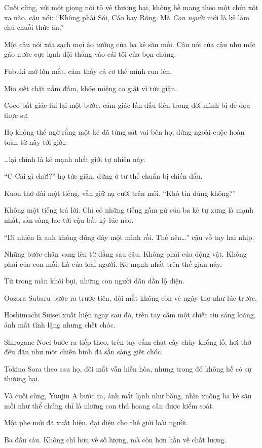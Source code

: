 \documentclass[../main.tex]{subfiles}
\begin{document}
Cuối cùng, với một giọng nói tỏ vẻ thương hại, không hề mang theo một chút xót xa nào, cậu nói: ``Không phải Sói, Cáo hay Rồng. Mà \emph{Con người} mới là kẻ làm chủ chuỗi thức ăn.''

Một câu nói xóa sạch mọi ảo tưởng của ba kẻ săn mồi. Câu nói của cậu như một gáo nước cực lạnh dội thẳng vào cái tôi của bọn chúng.

Fubuki mở lớn mắt, cảm thấy cả cơ thể mình run lên.

Mio siết chặt nắm đấm, khóe miệng co giật vì tức giận.

Coco bất giác lùi lại một bước, cảm giác lần đầu tiên trong đời mình bị đe dọa thực sự.

Họ không thể ngờ rằng một kẻ đã từng sát vai bên họ, đứng ngoài cuộc hoàn toàn từ nãy tới giờ\dots

\dots lại chính là kẻ mạnh nhất giới tự nhiên này.

``C-Cái gì chứ!?'' họ tức giận, đứng ở tư thế chuẩn bị chiến đấu.

Kuon thở dài một tiếng, vẫn giữ nụ cười trên môi. ``Khó tin đúng không?''

Không một tiếng trả lời. Chỉ có những tiếng gầm gừ của ba kẻ tự xưng là mạnh nhất, sẵn sàng lao tới cậu bất kỳ lúc nào.

``Dĩ nhiên là anh không đứng đây một mình rồi. Thế nên\dots'' cậu vỗ tay hai nhịp.

Những bước chân vang lên từ đằng sau cậu. Không phải của động vật. Không phải của con mồi. Là của loài người. Kẻ mạnh nhất trên thế gian này.

Từ trong màn khói bụi, những con người dần dần lộ diện.

Oozora Subaru bước ra trước tiên, đôi mắt không còn vẻ ngây thơ như lúc trước.

Hoshimachi Suisei xuất hiện ngay sau đó, trên tay cầm một chiếc rìu sáng loáng, ánh mắt tĩnh lặng nhưng chết chóc.

Shirogane Noel bước ra tiếp theo, trên tay cầm chặt cây chùy khổng lồ, hơi thở đều đặn như một chiến binh đã sẵn sàng giết chóc.

Tokino Sora theo sau họ, đôi mắt vẫn hiền hòa, nhưng trong đó không hề có sự thương hại.

Và cuối cùng, Yuujin A bước ra, ánh mắt lạnh như băng, nhìn xuống ba kẻ săn mồi như thể chúng chỉ là những con thú hoang cần được kiểm soát.

Một phe mới đã xuất hiện, đại diện cho thế giới loài người.

Ba đấu sáu. Không chỉ hơn về số lượng, mà còn hơn hẳn về chất lượng.
\end{document}
